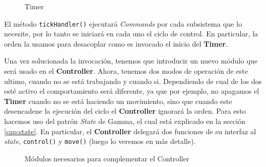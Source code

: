 \begin{figure}[h]
\caption{Timer}
\begin{center}
\end{center}
\end{figure}

El método \verb|tickHandler()| ejecutará \textit{Commands} por cada subsistema que lo necesite, por lo tanto se iniciará en cada uno el ciclo de control. En particular, la orden la usamos para desacoplar como es invocado el inicio del \textbf{Timer}.

Una vez solucionada la invocación, tenemos que introducir un nuevo módulo que será usado en el \textbf{Controller}. Ahora, tenemos dos modos de operación de este ultimo, cuando no se está trabajando y cuando si. Dependiendo de cual de los dos esté activo el comportamiento será diferente, ya que por ejemplo, no apagamos el \textbf{Timer} cuando no se está haciendo un movimiento, sino que cuando este desencadene la ejecución del ciclo el \textbf{Controller} ignorará la orden. Para esto hacemos uso del patrón \textit{State} de Gamma\cite{Gamma:1995:DPE:186897}, el cual está explicado en la sección \ref{cap:state}. En particular, el \textbf{Controller} delegará dos funciones de su interfaz al \textit{state}, \verb|control()| y \verb|move()| (luego lo veremos en más detalle).

\begin{figure}[h]
\caption{Módulos necesarios para complementar el Controller}
\begin{center}
\end{center}
\end{figure}

